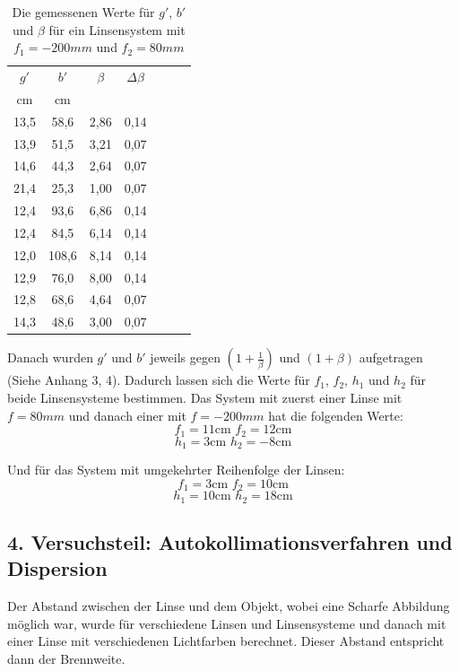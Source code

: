 \documentclass[11pt,a4paper]{article}
\begin{document}
\begin{table}[h]
	\centering
	\begin{tabular*}{0.50\textwidth}{@{\extracolsep{\fill}}cc|ccccc}
		\toprule
		$g'$ & $b'$ & $\beta$ & $\Delta \beta$   \\
		cm & cm& &\\
		13,5&58,6&2,86&0,14\\
		13,9&51,5&3,21&0,07\\
		14,6&44,3&2,64&0,07\\
		21,4&25,3&1,00&0,07\\
		12,4&93,6&6,86&0,14\\
		12,4&84,5&6,14&0,14\\
		12,0&108,6&8,14&0,14\\
		12,9&76,0&8,00&0,14\\
		12,8&68,6&4,64&0,07\\
		14,3&48,6&3,00&0,07\\
		\bottomrule
	\end{tabular*}
	\caption{Die gemessenen Werte für $g'$, $b'$ und $\beta$ für ein Linsensystem mit $f_1 = -200mm$ und $f_2 = 80mm$}
\end{table}

\FloatBarrier
Danach wurden $g'$ und $b'$ jeweils gegen $(1+\frac{1}{\beta})$ und $(1+\beta)$ aufgetragen (Siehe Anhang 3, 4). 
Dadurch lassen sich die Werte für $f_1$, $f_2$, $h_1$ und $h_2$ für beide Linsensysteme bestimmen. 
Das System mit zuerst einer Linse mit $f=80mm$ und danach einer mit $f=-200mm$ hat die folgenden Werte:
$$f_1 = 11\textrm{cm    } f_2 = 12\textrm{cm}$$
$$ h_1 = 3\textrm{cm    } h_2 = -8 \textrm{cm}$$

Und für das System mit umgekehrter Reihenfolge der Linsen:
$$f_1 = 3\textrm{cm    } f_2 = 10 \textrm{cm}$$
$$ h_1 = 10\textrm{cm    } h_2 = 18 \textrm{cm}$$


\subsection{4. Versuchsteil: Autokollimationsverfahren und Dispersion}
Der Abstand zwischen der Linse und dem Objekt, wobei eine Scharfe Abbildung möglich war, wurde für verschiedene Linsen und Linsensysteme und danach mit einer Linse mit verschiedenen Lichtfarben berechnet. Dieser Abstand entspricht dann der Brennweite. 
\end{document}
